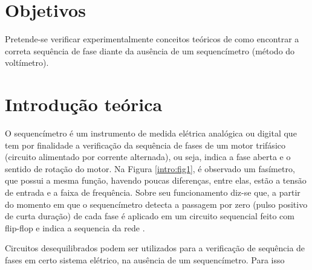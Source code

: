\documentclass[a4paper,12pt,oneside,openany,table,xcdraw]{article}
\begin{document}
\newcommand{\thedepartment}{Faculdade de Engenharia Elétrica}
\newcommand{\thecourse}{FEELT}
\newcommand{\thetitle}{VERIFICAÇÃO DA SEQUÊNCIA DE FASES DAS TENSÕES}
\newcommand{\thetype}{Relatório da Disciplina de Experimental de Circuitos Elétricos II}
\newcommand{\theproftitle}{Bacharel em Engenharia Elétrica}
\newcommand{\thestudent}{Lesly Viviane Montúfar Berrios\\
\centering11811ETE001}
\newcommand{\theadvisor}{Prof. Wellington Maycon Santos Bernardes}
\newcommand{\thecity}{Uberlândia}

\thispagestyle{empty}


\onehalfspacing
\tableofcontents %
\newpage

\section{Objetivos} %
Pretende-se verificar experimentalmente conceitos teóricos de como encontrar a correta sequência de
fase diante da ausência de um sequencímetro (método do voltímetro).

\section{Introdução teórica} %

O sequencímetro é um instrumento de medida elétrica analógica ou digital que tem por  finalidade a verificação da sequência de fases de um motor trifásico (circuito alimentado por corrente alternada), ou seja, indica a fase aberta e o sentido de rotação do motor. Na Figura \ref{intro:fig1}, é observado um fasímetro, que possui a mesma função, havendo poucas diferenças, entre elas, estão a tensão de entrada e a faixa de frequência. Sobre seu funcionamento diz-se que, a partir do momento em que o sequencímetro detecta a passagem por zero (pulso positivo de curta duração) de cada fase é aplicado em um circuito sequencial feito com flip-flop e indica a sequencia da rede \cite{UNIR}.

Circuitos desequilibrados podem ser utilizados para a verificação de sequência de fases em certo sistema elétrico, na ausência de um sequencímetro. Para isso
\end{document}
